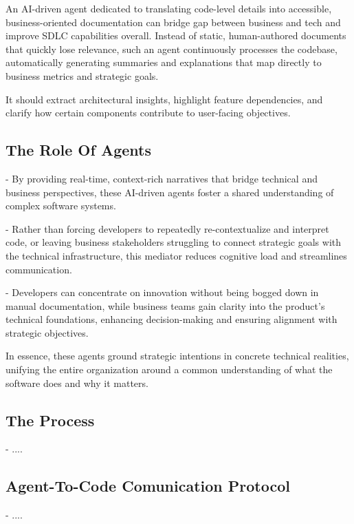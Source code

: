 \documentclass[12pt,twocolumn]{article}
\begin{document}
An AI-driven agent dedicated to translating code-level details into accessible, business-oriented documentation can bridge 
gap between business and tech and improve SDLC capabilities overall. Instead of static, human-authored documents that quickly
lose relevance, such an agent continuously processes the codebase, automatically generating summaries and explanations that map 
directly to business metrics and strategic goals. 

It should extract architectural insights, highlight feature dependencies, and 
clarify how certain components contribute to 
user-facing objectives. 

\subsection{The Role Of Agents}

- By providing real-time, context-rich narratives that bridge technical and business perspectives, these AI-driven agents 
foster a shared understanding of complex software systems. 

- Rather than forcing developers to repeatedly re-contextualize 
and interpret code, or leaving business stakeholders struggling to connect strategic goals with the technical infrastructure, 
this mediator reduces cognitive load and streamlines communication. 

- Developers can concentrate on innovation without being bogged down in manual documentation, while business teams gain clarity into the product’s technical foundations, 
enhancing decision-making and ensuring alignment with strategic objectives. 

In essence, these agents ground strategic intentions in concrete technical realities, unifying the entire organization around a common understanding of what the 
software does and why it matters.

\subsection{The Process}

- ....

\subsection{Agent-To-Code Comunication Protocol}

- ....




\printbibliography%
\end{document}
